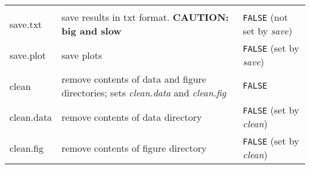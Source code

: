 \documentclass[]{article}
\begin{document}
\begin{longtable}[]{@{}lll@{}}
\begin{minipage}[t]{0.18\columnwidth}
\end{minipage}\tabularnewline
\begin{minipage}[t]{0.18\columnwidth}\raggedright\strut
save.txt\strut
\end{minipage} & \begin{minipage}[t]{0.56\columnwidth}\raggedright\strut
save results in txt format. \textbf{CAUTION: big and slow}\strut
\end{minipage} & \begin{minipage}[t]{0.18\columnwidth}\raggedright\strut
\texttt{FALSE} (not set by \emph{save})\strut
\end{minipage}\tabularnewline
\begin{minipage}[t]{0.18\columnwidth}\raggedright\strut
save.plot\strut
\end{minipage} & \begin{minipage}[t]{0.56\columnwidth}\raggedright\strut
save plots\strut
\end{minipage} & \begin{minipage}[t]{0.18\columnwidth}\raggedright\strut
\texttt{FALSE} (set by \emph{save})\strut
\end{minipage}\tabularnewline
\begin{minipage}[t]{0.18\columnwidth}\raggedright\strut
clean\strut
\end{minipage} & \begin{minipage}[t]{0.56\columnwidth}\raggedright\strut
remove contents of data and figure directories; sets \emph{clean.data}
and \emph{clean.fig}\strut
\end{minipage} & \begin{minipage}[t]{0.18\columnwidth}\raggedright\strut
\texttt{FALSE}\strut
\end{minipage}\tabularnewline
\begin{minipage}[t]{0.18\columnwidth}\raggedright\strut
clean.data\strut
\end{minipage} & \begin{minipage}[t]{0.56\columnwidth}\raggedright\strut
remove contents of data directory\strut
\end{minipage} & \begin{minipage}[t]{0.18\columnwidth}\raggedright\strut
\texttt{FALSE} (set by \emph{clean})\strut
\end{minipage}\tabularnewline
\begin{minipage}[t]{0.18\columnwidth}\raggedright\strut
clean.fig\strut
\end{minipage} & \begin{minipage}[t]{0.56\columnwidth}\raggedright\strut
remove contents of figure directory\strut
\end{minipage} & \begin{minipage}[t]{0.18\columnwidth}\raggedright\strut
\texttt{FALSE} (set by \emph{clean})\strut
\end{minipage}\tabularnewline
\bottomrule
\end{longtable}
\end{document}
